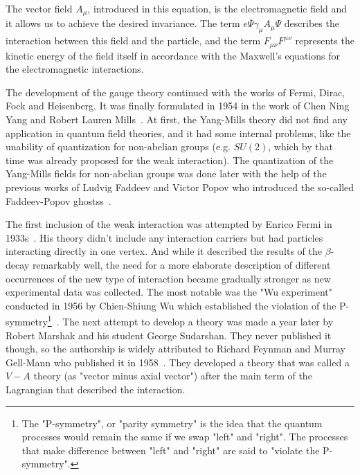 The vector field $A_{\mu}$, introduced in this equation, is the electromagnetic field and it allows us to achieve the desired invariance. The term $e \bar \Psi \gamma_{\mu} A_{\mu} \Psi$ describes the interaction between this field and the particle, and the term $F_{\mu\nu}F^{\mu\nu}$ represents the kinetic energy of the field itself in accordance with the Maxwell's equations for the electromagnetic interactions.

The development of the gauge theory continued with the works of Fermi, Dirac, Fock and Heisenberg. It was finally formulated in 1954 in the work of Chen Ning Yang and Robert Lauren Mills~\cite{lib:theory_qed_yang_mills}. At first, the Yang-Mills theory did not find any application in quantum field theories, and it had some internal problems, like the unability of quantization for non-abelian groups (e.g. $SU(2)$, which by that time was already proposed for the weak interaction). The quantization of the Yang-Mills fields for non-abelian groups was done later with the help of the previous works of Ludvig Faddeev and Victor Popov who introduced the so-called Faddeev-Popov ghostss~\cite{lib:theory_qed_faddeev_popov}.

The first inclusion of the weak interaction was attempted by Enrico Fermi in 1933s~\cite{lib:theory_qed_fermi}. His theory didn't include any interaction carriers but had particles interacting directly in one vertex. And while it described the results of the $\beta$-decay remarkably well, the need for a more elaborate description of different occurrences of the new type of interaction became gradually stronger as new experimental data was collected. The most notable was the "Wu experiment" conducted in 1956 by Chien-Shiung Wu which established the violation of the P-symmetry\footnote{The "P-symmetry", or "parity symmetry" is the idea that the quantum processes would remain the same if we swap "left" and "right". The processes that make difference between "left" and "right" are said to "violate the P-symmetry".}~\cite{lib:theory_qed_wu}. The next attempt to develop a theory was made a year later by Robert Marshak and his student George Sudarshan. They never published it though, so the authorship is widely attributed to Richard Feynman and Murray Gell-Mann who published it in 1958~\cite{lib:theory_qed_VA}. They developed a theory that was called a $V-A$ theory (as "vector minus axial vector") after the main term of the Lagrangian that described the interaction.


